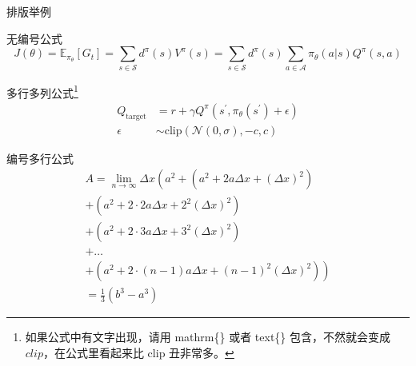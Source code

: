 \documentclass{beamer}
\begin{document}
\begin{frame}{排版举例}
	\begin{exampleblock}{无编号公式} %
		\begin{equation*}
            J(\theta) = \mathbb{E}_{\pi_\theta}[G_t] = \sum_{s\in\mathcal{S}} d^\pi (s)V^\pi(s)=\sum_{s\in\mathcal{S}} d^\pi(s)\sum_{a\in\mathcal{A}}\pi_\theta(a|s)Q^\pi(s,a)
		\end{equation*}
	\end{exampleblock}
	\begin{exampleblock}{多行多列公式\footnote{如果公式中有文字出现，请用 mathrm\{\} 或者 text\{\} 包含，不然就会变成 $clip$，在公式里看起来比 $\mathrm{clip}$ 丑非常多。}}
		\begin{align}
            Q_\mathrm{target}&=r+\gamma Q^\pi(s^\prime, \pi_\theta(s^\prime)+\epsilon)\\
            \epsilon&\sim\mathrm{clip}(\mathcal{N}(0, \sigma), -c, c)\nonumber
		\end{align}
	\end{exampleblock}
\end{frame}

\begin{frame}
	\begin{exampleblock}{编号多行公式}
	\begin{multline}
		A=\lim_{n\rightarrow\infty}\Delta x\left(a^{2}+\left(a^{2}+2a\Delta x+\left(\Delta x\right)^{2}\right)\right.\label{eq:reset}\\
		+\left(a^{2}+2\cdot2a\Delta x+2^{2}\left(\Delta x\right)^{2}\right)\\
		+\left(a^{2}+2\cdot3a\Delta x+3^{2}\left(\Delta x\right)^{2}\right)\\
		+\ldots\\
		\left.+\left(a^{2}+2\cdot(n-1)a\Delta x+(n-1)^{2}\left(\Delta x\right)^{2}\right)\right)\\
		=\frac{1}{3}\left(b^{3}-a^{3}\right)
	\end{multline}
\end{exampleblock}
\end{frame}
\end{document}
